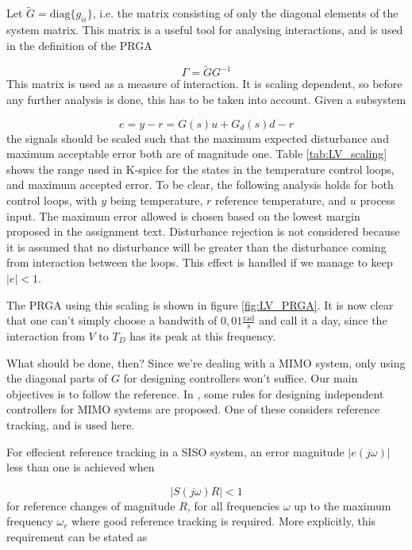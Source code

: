 \documentclass[12pt]{article}
\begin{document}
Let $\tilde{G} = \textrm{diag}\{g_{ii}\}$, i.e. the matrix consisting of only the diagonal elements of the system matrix. This matrix is a useful tool for analysing interactions, and is used in the definition of the PRGA

\begin{equation}
\Gamma = \tilde{G} G^{-1}
\end{equation}
This matrix is used as a measure of interaction. It is scaling dependent, so before any further analysis is done, this has to be taken into account. Given a subsystem

\begin{equation}
e = y - r = G(s) u + G_d(s) d - r
\end{equation}
the signals should be scaled such that the maximum expected disturbance and maximum acceptable error both are of magnitude one. Table \ref{tab:LV_scaling} shows the range used in K-spice for the states in the temperature control loops, and maximum accepted error. To be clear, the following analysis holds for both control loops, with $y$ being temperature, $r$ reference temperature, and $u$ process input. The maximum error allowed is chosen based on the lowest margin proposed in the assignment text. Disturbance rejection is not considered because it is assumed that no disturbance will be greater than the disturbance coming from interaction between the loops. This effect is handled if we manage to keep $| e | < 1$.

The PRGA using this scaling is shown in figure \ref{fig:LV_PRGA}. It is now clear that one can't simply choose a bandwith of $0,01 \frac{\textrm{rad}}{\textrm{s}}$ and call it a day, since the interaction from $V$ to $T_D$ has its peak at this frequency.

What should be done, then? Since we're dealing with a MIMO system, only using the diagonal parts of $G$ for designing controllers won't suffice. Our main objectives is to follow the reference. In \cite{skogestad}, some rules for designing independent controllers for MIMO systems are proposed. One of these considers reference tracking, and is used here.

For effecient reference tracking in a SISO system, an error magnitude $| e(j \omega) |$ less than one is achieved when

\begin{equation}
| S(j \omega) R | < 1
\end{equation}
for reference changes of magnitude $R$, for all frequencies $\omega$ up to the maximum frequency $\omega_r$ where good reference tracking is required. More explicitly, this requirement can be stated as
\end{document}
